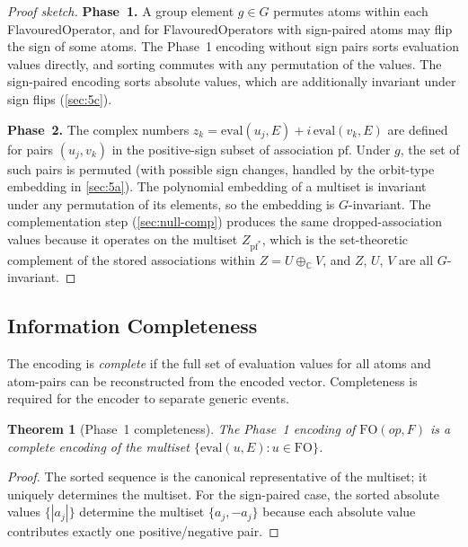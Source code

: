 \documentclass[11pt,a4paper]{article}
\theoremstyle{definition}
\theoremstyle{plain}
\newtheorem{theorem}[definition]{Theorem}
\theoremstyle{remark}
\newcommand{\C}{\mathbb{C}}
\newcommand{\eval}{\mathrm{eval}}
\newcommand{\fo}{\mathrm{FO}}
\newcommand{\pf}{\mathrm{pf}}
\begin{document}
\begin{proof}[Proof sketch]
\textbf{Phase~1.}  A group element $g \in G$ permutes atoms within each
FlavouredOperator, and for FlavouredOperators with sign-paired atoms may flip
the sign of some atoms.  The Phase~1 encoding without sign pairs sorts
evaluation values directly, and sorting commutes with any permutation of the
values.  The sign-paired encoding sorts absolute values, which are additionally
invariant under sign flips (\cref{sec:5c}).

\textbf{Phase~2.}  The complex numbers $z_k = \eval(u_j,E) +
i\,\eval(v_k,E)$ are defined for pairs $(u_j,v_k)$ in the positive-sign subset
of association $\pf$.  Under $g$, the set of such pairs is permuted (with
possible sign changes, handled by the orbit-type embedding in
\cref{sec:5a}).  The polynomial embedding of a multiset is invariant under any
permutation of its elements, so the embedding is $G$-invariant.  The
complementation step (\cref{sec:null-comp}) produces the same dropped-association
values because it operates on the multiset $Z_{\pf^*}$, which is the
set-theoretic complement of the stored associations within $Z = U \oplus_\C V$,
and $Z$, $U$, $V$ are all $G$-invariant.
\end{proof}

\subsection{Information Completeness}

The encoding is \emph{complete} if the full set of evaluation values for all
atoms and atom-pairs can be reconstructed from the encoded vector.  Completeness
is required for the encoder to separate generic events.

\begin{theorem}[Phase~1 completeness]
The Phase~1 encoding of $\fo(\mathit{op}, F)$ is a complete encoding of the
multiset $\{\eval(u, E) : u \in \fo\}$.
\end{theorem}
\begin{proof}
The sorted sequence is the canonical representative of the multiset; it uniquely
determines the multiset.  For the sign-paired case, the sorted
absolute values $\{|a_j|\}$ determine the multiset $\{a_j, -a_j\}$ because each
absolute value contributes exactly one positive/negative pair.
\end{proof}
\end{document}
